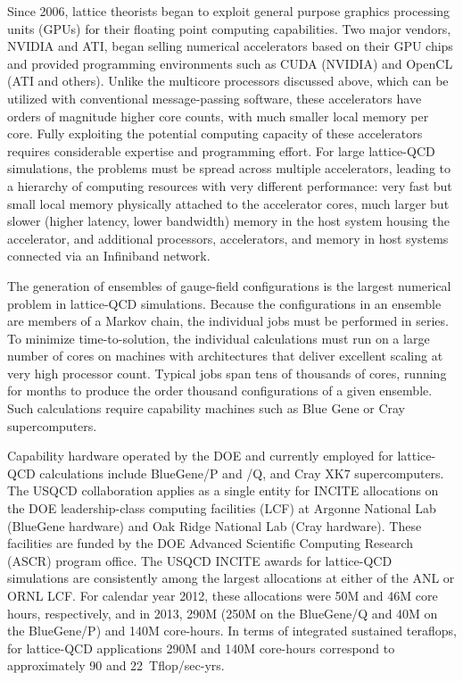 Since 2006, lattice theorists began to exploit general purpose graphics
processing units (GPUs) for their floating point computing capabilities.  Two
major vendors, NVIDIA and ATI, began selling numerical accelerators based on
their GPU chips and provided programming environments such as CUDA (NVIDIA)
and OpenCL (ATI and others).  Unlike the multicore processors discussed above,
which can be utilized with conventional message-passing software, these
accelerators have orders of magnitude higher core counts, with much smaller
local memory per core.  Fully exploiting the potential computing capacity of
these accelerators requires considerable expertise and programming effort.
For large lattice-QCD simulations, the problems must be spread across multiple
accelerators, leading to a hierarchy of computing resources with very
different performance: very fast but small local memory physically attached to
the accelerator cores, much larger but slower (higher latency, lower
bandwidth) memory in the host system housing the accelerator, and additional
processors, accelerators, and memory in host systems connected via an
Infiniband network.

The generation of ensembles of gauge-field configurations is the largest
numerical problem in lattice-QCD simulations.  Because the configurations in an
ensemble are members of a Markov chain, the individual jobs must be performed
in series.  To minimize time-to-solution, the individual calculations must run
on a large number of cores on machines with architectures that deliver
excellent scaling at very high processor count.  Typical jobs span tens of
thousands of cores, running for months to produce the order thousand
configurations of a given ensemble.  Such calculations require capability
machines such as Blue Gene or Cray supercomputers.

Capability hardware operated by the DOE and currently employed for lattice-QCD
calculations include BlueGene/P and /Q, and Cray XK7 supercomputers.  The
USQCD collaboration applies as a single entity for INCITE allocations on the
DOE leadership-class computing facilities (LCF) at Argonne National Lab
(BlueGene hardware) and Oak Ridge National Lab (Cray hardware).  These
facilities are funded by the DOE Advanced Scientific Computing Research (ASCR)
program office.  The USQCD INCITE awards for lattice-QCD simulations are
consistently among the largest allocations at either of the ANL or ORNL LCF.
For calendar year 2012, these allocations were 50M and 46M core hours,
respectively, and in 2013, 290M (250M on the BlueGene/Q and 40M on the
BlueGene/P) and 140M core-hours.  In terms of integrated sustained teraflops,
for lattice-QCD applications 290M and 140M core-hours correspond to
approximately 90 and 22~Tflop/sec-yrs.

